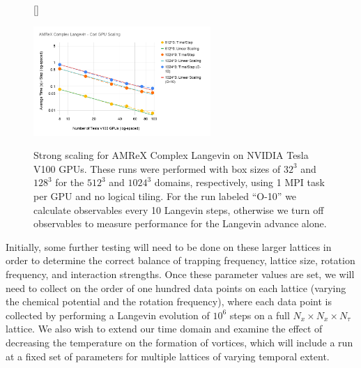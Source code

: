 \documentclass[onecolumn, 12pt]{article}
\begin{document}
%
\begin{figure}[h]
[\FBwidth]
    {\caption{Strong scaling for AMReX Complex Langevin on NVIDIA Tesla V100 GPUs. These runs were performed with box sizes of $32^3$ and $128^3$ for the $512^3$ and $1024^3$ domains, respectively, using 1 MPI task per GPU and no logical tiling. For the run labeled ``O-10'' we calculate observables every 10 Langevin steps, otherwise we turn off observables to measure performance for the Langevin advance alone.}\label{Fig:GPUScaling}}
    {\includegraphics[width=0.6\textwidth]{./AMReX_Complex_Langevin_Cori_GPU_Scaling.png}}
\end{figure}
%

Initially, some further testing will need to be done on these larger lattices in order to determine the correct balance of trapping frequency, lattice size, rotation frequency, and interaction strengths. Once these parameter values are set, we will need to collect on the order of one hundred data points on each lattice (varying the chemical potential and the rotation frequency), where each data point is collected by performing a Langevin evolution of $10^{6}$ steps on a full $N_{x} \times N_{x} \times N_{\tau}$ lattice. We also wish to extend our time domain and examine the effect of decreasing the temperature on the formation of vortices, which will include a run at a fixed set of parameters for multiple lattices of varying temporal extent. %

{}
%

\end{document}
